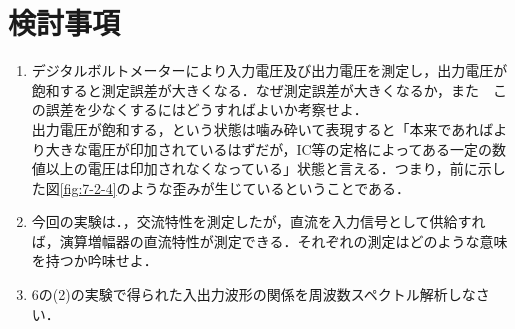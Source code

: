 \documentclass[10pt, a4j, dvipdfmx]{jarticle}
\begin{document}
\section{検討事項}
\begin{enumerate}
    \item デジタルボルトメーターにより入力電圧及び出力電圧を測定し，出力電圧が飽和すると測定誤差が大きくなる．なぜ測定誤差が大きくなるか，また　この誤差を少なくするにはどうすればよいか考察せよ．\\
    
    出力電圧が飽和する，という状態は噛み砕いて表現すると「本来であればより大きな電圧が印加されているはずだが，IC等の定格によってある一定の数値以上の電圧は印加されなくなっている」状態と言える．つまり，前に示した図\ref{fig:7-2-4}のような歪みが生じているということである．

    \item 今回の実験は．，交流特性を測定したが，直流を入力信号として供給すれば，演算増幅器の直流特性が測定できる．それぞれの測定はどのような意味を持つか吟味せよ．\\

    \item 6の(2)の実験で得られた入出力波形の関係を周波数スペクトル解析しなさい． \\

\end{enumerate}
\end{document}
